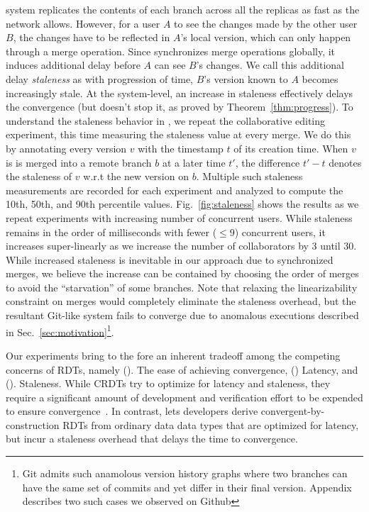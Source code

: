 \quark system replicates the contents of each branch across all the
replicas as fast as the network allows. However, for a user $A$ to
see the changes made by the other user $B$, the changes have to be
reflected in $A$'s local version, which can only happen through a
merge operation. Since \quark synchronizes merge operations globally,
it induces additional delay before $A$ can see $B$'s changes. We call
this additional delay \emph{staleness} as with progression of time,
$B$'s version known to $A$ becomes increasingly stale. At the
system-level, an increase in staleness effectively delays the
convergence (but doesn't stop it, as proved by
Theorem~\ref{thm:progress}). To understand the staleness behavior in
\quark, we repeat the collaborative editing experiment, this time
measuring the staleness value at every merge. We do this by annotating
every version $v$ with the timestamp $t$ of its creation time. When
$v$ is is merged into a remote branch $b$ at a later time $t'$, the
difference $t' - t$ denotes the staleness of $v$ w.r.t the new version
on $b$. Multiple such staleness measurements are recorded for each
experiment and analyzed to compute the 10th, 50th, and 90th percentile
values. Fig.~\ref{fig:staleness} shows the results as we repeat
experiments with increasing number of concurrent users. While
staleness remains in the order of milliseconds with fewer ($\leq 9$)
concurrent users, it increases super-linearly as we increase the
number of collaborators by 3 until 30. While increased staleness is
inevitable in our approach due to synchronized merges, we believe the
increase can be contained by choosing the order of merges to avoid the
``starvation'' of some branches. Note that relaxing the
linearizability constraint on merges would completely eliminate the
staleness overhead, but the resultant Git-like system fails to
converge due to anomalous executions described in
Sec.~\ref{sec:motivation}\footnote{
  Git admits such anamolous version history graphs where two branches
  can have the same set of commits and yet differ in their final
  version. Appendix describes two such cases we observed on Github}. 

Our experiments bring to the fore an inherent tradeoff among the
competing concerns of RDTs, namely (). The ease of achieving
convergence, () Latency, and ().  Staleness. While CRDTs
try to optimize for latency and staleness, they require a significant
amount of development and verification effort to be expended to ensure
convergence~\cite{kleppmann2017}. In contrast, \quark lets developers
derive convergent-by-construction RDTs from ordinary data data types
that are optimized for latency, but incur a staleness overhead that
delays the time to convergence. 



